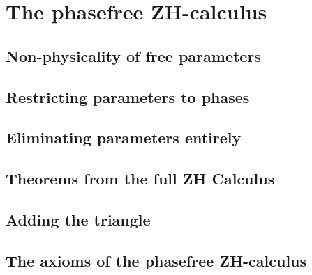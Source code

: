 \chapter{The phasefree ZH-calculus}\label{chap:phasefree}
\section{Non-physicality of free parameters}
\section{Restricting parameters to phases}
\section{Eliminating parameters entirely}
\section{Theorems from the full ZH Calculus}
\section{Adding the triangle}
\section{The axioms of the phasefree ZH-calculus}
